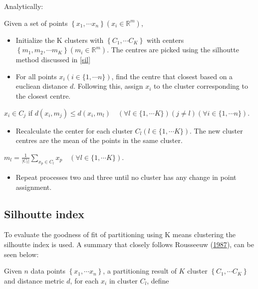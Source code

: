 \documentclass[11pt,preprint, authoryear]{elsarticle}
\numberwithin{equation}{section}
\numberwithin{figure}{section}
\numberwithin{table}{section}
\def\tightlist{} %
\begin{document}
Analytically:

Given a set of points
\(\left\{x_1, \cdots x_n\right\}\left(x_i \in \mathbb{R}^m\right)\),

\begin{itemize}
\item
  Initialize the K clusters with \(\left\{C_1, \cdots C_K\right\}\) with
  centers
  \(\left\{m_1, m_2, \cdots m_K\right\}\left(m_i \in \mathbb{R}^m\right)\).
  The centres are picked using the silhoutte method discussed in
  \ref{sil}
\item
  For all points \(x_i(i \in\{1, \cdots n\})\), find the centre that
  closest based on a eucliean distance \(d\). Following this, assign
  \(x_i\) to the cluster corresponding to the closest centre.
\end{itemize}

\(x_i \in C_j\) if
\(d\left(x_i, m_j\right) \leq d\left(x_i, m_l\right) \quad(\forall l \in\{1, \cdots K\})(j \neq l)(\forall i \in\{1, \cdots n\})\).

\begin{itemize}
\tightlist
\item
  Recalculate the center for each cluster \(C_l(l \in\{1, \cdots K\})\).
  The new cluster centres are the mean of the points in the same
  cluster.
\end{itemize}

\(m_l=\frac{1}{\left|C_l\right|} \sum_{x_p \in C_l} x_p \quad(\forall l \in\{1, \cdots K\})\).

\begin{itemize}
\tightlist
\item
  Repeat processes two and three until no cluster has any change in
  point assignment.
\end{itemize}

\hypertarget{silhoutte-index}{%
\subsection{\texorpdfstring{Silhoutte index
\label{sil}}{Silhoutte index }}\label{silhoutte-index}}

To evaluate the goodness of fit of partitioning using K means clustering
the silhoutte index is used. A summary that closely follows Rousseeuw
(\protect\hyperlink{ref-rousseeuw1987silhouettes}{1987}), can be seen
below:

Given \(n\) data points \(\left\{x_1, \cdots x_n\right\}\), a
partitioning result of \(K\) cluster \(\left\{C_1, \cdots C_K\right\}\)
and distance metric \(d\), for each \(x_i\) in cluster \(C_l\), define
\end{document}
